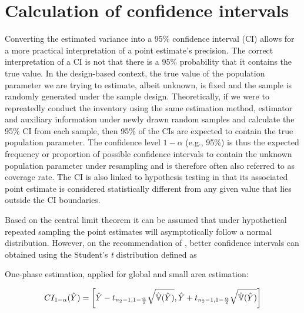 \newpage




\section{Calculation of confidence intervals}
\label{sec:confint_calc}

Converting the estimated variance into a 95\% confidence interval (CI) allows for a more practical interpretation of a point estimate's precision. The correct interpretation of a CI is not that there is a 95\% probability that it contains the true value. In the design-based context, the true value of the population parameter we are trying to estimate, albeit unknown, is fixed and the sample is randomly generated under the sample design. Theoretically, if we were to repreatedly conduct the inventory using the same estimation method, estimator and auxiliary information under newly drawn random samples and calculate the 95\%  CI from each sample, then 95\% of the CIs are expected to contain the true population parameter. The confidence level $1-\alpha$ (e.g., 95\%) is thus the expected frequency or proportion of possible confidence intervals to contain the unknown population parameter under resampling and is therefore often also referred to as coverage rate. The CI is also linked to hypothesis testing in that its associated point estimate is considered statistically different from any given value that lies outside the CI boundaries.

Based on the central limit theorem it can be assumed that under hypothetical repeated sampling the point estimates will asymptotically follow a normal distribution. However, on the recommendation of \citet{mandallaz2013a}, better confidence intervals can obtained using the Student's \textit{t} distribution defined as

\vspace{4mm}

One-phase estimation, applied for global and small area estimation:

\begin{equation}\label{ci_1phase}
CI_{1-\alpha}(\hat{Y})=\bigg{\lbrack}\hat{Y}-t_{n_{2}-1, 1-\frac{\alpha}{2}}\sqrt{\hat{\mathbb{V}}(\hat{Y})},
                              \hat{Y}+t_{n_{2}-1, 1-\frac{\alpha}{2}}\sqrt{\hat{\mathbb{V}}(\hat{Y})}\bigg{\rbrack}
\end{equation}


